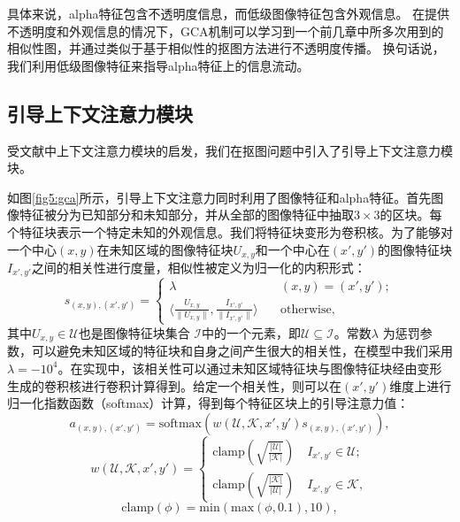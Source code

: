 具体来说，alpha特征包含不透明度信息，而低级图像特征包含外观信息。
在提供不透明度和外观信息的情况下，GCA机制可以学习到一个前几章中所多次用到的相似性图，并通过类似于基于相似性的抠图方法进行不透明度传播。
换句话说，我们利用低级图像特征来指导alpha特征上的信息流动。

\subsection{引导上下文注意力模块}
受文献\parencite{yu2018generative}中上下文注意力模块的启发，我们在抠图问题中引入了引导上下文注意力模块。

如图\ref{fig5:gca}所示，引导上下文注意力同时利用了图像特征和alpha特征。首先图像特征被分为已知部分和未知部分，并从全部的图像特征中抽取$3\times 3$的区块。每个特征块表示一个特定未知的外观信息。我们将特征块变形为卷积核。为了能够对一个中心$ (x,y)$在未知区域的图像特征块$ U_{x,y} $和一个中心在$ (x',y') $的图像特征块$ I_{x', y'} $之间的相关性进行度量，相似性被定义为归一化的内积形式：
\begin{equation}
	s_{(x,y), (x',y')} = 	
	\begin{cases}
	\lambda \quad &(x,y)=(x',y');\\
	\langle \frac{U_{x, y}}{\|U_{x, y}\|},\frac{I_{x', y'}}{\|I_{x', y'}\|}\rangle \quad &\mathrm{otherwise},	
	\end{cases}
\end{equation}
其中$ U_{x, y}\in\mathcal{U}$也是图像特征块集合 $ \mathcal{I} $中的一个元素，即$ \mathcal{U} \subseteq \mathcal{I} $。常数$ \lambda $ 为惩罚参数，可以避免未知区域的特征块和自身之间产生很大的相关性，在模型中我们采用$ \lambda =-10^4$。在实现中，该相关性可以通过未知区域特征块与图像特征块经由变形生成的卷积核进行卷积计算得到。给定一个相关性，则可以在$ (x',y') $维度上进行归一化指数函数（softmax）计算，得到每个特征区块上的引导注意力值：
\begin{equation}
	a_{(x,y), (x',y')} = \mathrm{softmax}(w(\mathcal{U}, \mathcal{K}, x',y')s_{(x,y), (x',y')}),
\end{equation}
\begin{equation}
w(\mathcal{U}, \mathcal{K}, x',y') = \begin{cases}
\mathrm{clamp}(\sqrt{\frac{|\mathcal{U}|}{|\mathcal{K}|}}) \quad I_{x',y'} \in \mathcal{U};\\
\mathrm{clamp}(\sqrt{\frac{|\mathcal{K}|}{|\mathcal{U}|}}) \quad I_{x',y'} \in \mathcal{K},
\end{cases}
\label{eq5:weight}
\end{equation}
\begin{equation}
\mathrm{clamp}(\phi) = \mathrm{min}(\mathrm{max}(\phi, 0.1), 10),
\end{equation}
